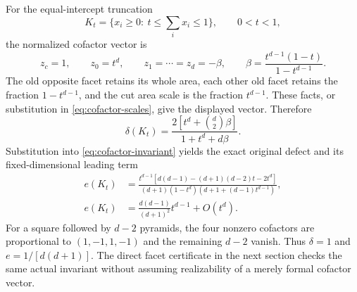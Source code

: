 For the equal-intercept truncation
\begin{equation}\label{eq:truncation-body}
 K_t=\{x_i\ge0:\ t\le\textstyle\sum_i x_i\le1\},\qquad0<t<1,
\end{equation}
the normalized cofactor vector is
\[
 z_c=1,\qquad z_0=t^d,\qquad z_1=\cdots=z_d=-\beta,
 \qquad\beta=\frac{t^{d-1}(1-t)}{1-t^{d-1}}.
\]
The old opposite facet retains its whole area, each other old facet
retains the fraction $1-t^{d-1}$, and the cut area scale is the fraction
$t^{d-1}$. These facts, or substitution in \eqref{eq:cofactor-scales},
give the displayed vector. Therefore
\begin{equation}\label{eq:truncation-delta}
 \delta(K_t)=\frac{2[t^d+\binom d2\beta]}{1+t^d+d\beta}.
\end{equation}
Substitution into \eqref{eq:cofactor-invariant} yields the exact original
defect and its fixed-dimensional leading term
\begin{equation}\label{eq:truncation-exact}
 \begin{split}
 e(K_t)&=\frac{t^{d-1}[d(d-1)-(d+1)(d-2)t-2t^d]}
 {(d+1)(1-t^d)(d+1+(d-1)t^{d-1})},\\
 e(K_t)&=\frac{d(d-1)}{(d+1)^2}t^{d-1}+O(t^d).
 \end{split}
\end{equation}
For a square followed by $d-2$ pyramids, the four nonzero cofactors are
proportional to $(1,-1,1,-1)$ and the remaining $d-2$ vanish. Thus
$\delta=1$ and $e=1/[d(d+1)]$. The direct facet certificate in the next
section checks the same actual invariant without assuming realizability
of a merely formal cofactor vector.
